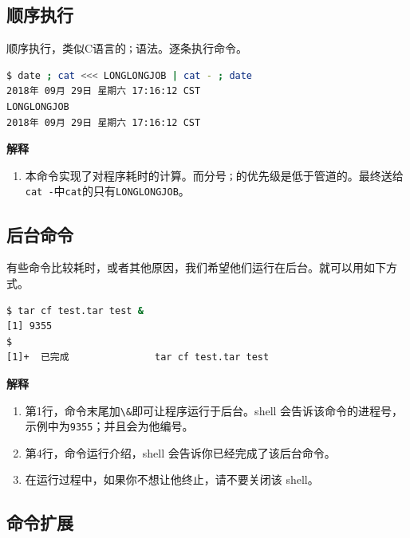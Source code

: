 \documentclass[doctor,openright,twoside]{sjtuthesis}
\providecommand{\tightlist}{%
    \setlength{\itemsep}{0pt}\setlength{\parskip}{0pt}}
\newcommand{\passthrough}[1]{#1}
\theoremstyle{plain}
\theoremstyle{definition}
\theoremstyle{remark}
\theoremstyle{ocrenumbox}
\theoremstyle{plain}
\begin{document}
\hypertarget{section-50}{%
\subsection{顺序执行}\label{section-50}}

顺序执行，类似C语言的\passthrough{\lstinline!；!}语法。逐条执行命令。

\begin{lstlisting}[language=bash]
$ date ; cat <<< LONGLONGJOB | cat - ; date
2018年 09月 29日 星期六 17:16:12 CST
LONGLONGJOB
2018年 09月 29日 星期六 17:16:12 CST
\end{lstlisting}

\textbf{解释}

\begin{enumerate}
\def\labelenumi{\arabic{enumi}.}
\tightlist
\item
  本命令实现了对程序耗时的计算。而分号\passthrough{\lstinline!；!}的优先级是低于管道的。最终送给\passthrough{\lstinline!cat -!}中\passthrough{\lstinline!cat!}的只有\passthrough{\lstinline!LONGLONGJOB!}。
\end{enumerate}

\hypertarget{section-51}{%
\subsection{后台命令}\label{section-51}}

有些命令比较耗时，或者其他原因，我们希望他们运行在后台。就可以用如下方式。

\begin{lstlisting}[language=bash]
$ tar cf test.tar test &
[1] 9355
$ 
[1]+  已完成               tar cf test.tar test
\end{lstlisting}

\textbf{解释}

\begin{enumerate}
\def\labelenumi{\arabic{enumi}.}
\tightlist
\item
  第1行，命令末尾加\passthrough{\lstinline!\&!}即可让程序运行于后台。shell 会告诉该命令的进程号，示例中为\passthrough{\lstinline!9355!}；并且会为他编号。
\item
  第4行，命令运行介绍，shell 会告诉你已经完成了该后台命令。
\item
  在运行过程中，如果你不想让他终止，请不要关闭该 shell。
\end{enumerate}

\hypertarget{section-52}{%
\subsection{命令扩展}\label{section-52}}
\end{document}
